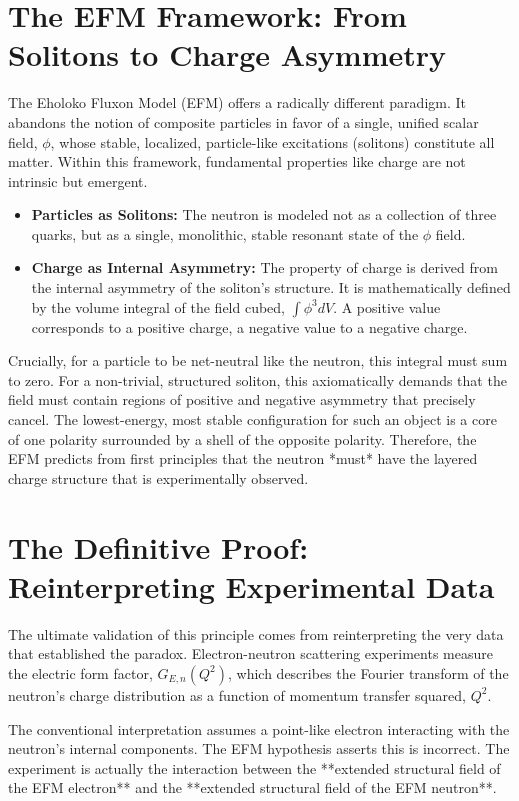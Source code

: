 \documentclass[11pt, twoside]{article}
\begin{document}
\section{The EFM Framework: From Solitons to Charge Asymmetry}
The Eholoko Fluxon Model (EFM) offers a radically different paradigm. It abandons the notion of composite particles in favor of a single, unified scalar field, $\phi$, whose stable, localized, particle-like excitations (solitons) constitute all matter. Within this framework, fundamental properties like charge are not intrinsic but emergent.

\begin{itemize}
    \item \textbf{Particles as Solitons:} The neutron is modeled not as a collection of three quarks, but as a single, monolithic, stable resonant state of the $\phi$ field.
    \item \textbf{Charge as Internal Asymmetry:} The property of charge is derived from the internal asymmetry of the soliton's structure. It is mathematically defined by the volume integral of the field cubed, $\int \phi^3 dV$. A positive value corresponds to a positive charge, a negative value to a negative charge.
\end{itemize}

Crucially, for a particle to be net-neutral like the neutron, this integral must sum to zero. For a non-trivial, structured soliton, this axiomatically demands that the field must contain regions of positive and negative asymmetry that precisely cancel. The lowest-energy, most stable configuration for such an object is a core of one polarity surrounded by a shell of the opposite polarity. Therefore, the EFM predicts from first principles that the neutron *must* have the layered charge structure that is experimentally observed.

\section{The Definitive Proof: Reinterpreting Experimental Data}
The ultimate validation of this principle comes from reinterpreting the very data that established the paradox. Electron-neutron scattering experiments measure the electric form factor, $G_{E,n}(Q^2)$, which describes the Fourier transform of the neutron's charge distribution as a function of momentum transfer squared, $Q^2$.

The conventional interpretation assumes a point-like electron interacting with the neutron's internal components. The EFM hypothesis asserts this is incorrect. The experiment is actually the interaction between the **extended structural field of the EFM electron** and the **extended structural field of the EFM neutron**.
\end{document}
